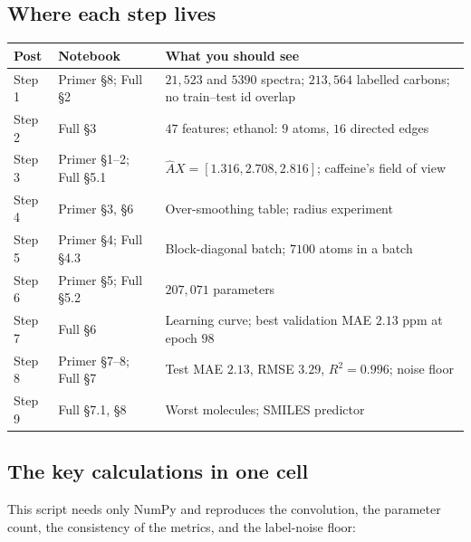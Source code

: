\documentclass[11pt]{article}
\newcommand{\Ah}{\hat{A}}
\begin{document}
\subsection{Where each step lives}
\begin{center}
\small
\begin{tabular}{@{}llp{6.2cm}@{}}
\toprule
Post & Notebook & What you should see\\
\midrule
Step 1 & Primer \S8; Full \S2 & $21{,}523$ and $5390$ spectra; $213{,}564$ labelled carbons; no train--test id overlap\\
Step 2 & Full \S3 & $47$ features; ethanol: $9$ atoms, $16$ directed edges\\
Step 3 & Primer \S1--2; Full \S5.1 & $\Ah X=[1.316,2.708,2.816]$; caffeine's field of view\\
Step 4 & Primer \S3, \S6 & Over-smoothing table; radius experiment\\
Step 5 & Primer \S4; Full \S4.3 & Block-diagonal batch; $7100$ atoms in a batch\\
Step 6 & Primer \S5; Full \S5.2 & $207{,}071$ parameters\\
Step 7 & Full \S6 & Learning curve; best validation MAE $2.13$ ppm at epoch $98$\\
Step 8 & Primer \S7--8; Full \S7 & Test MAE $2.13$, RMSE $3.29$, $R^2=0.996$; noise floor\\
Step 9 & Full \S7.1, \S8 & Worst molecules; SMILES predictor\\
\bottomrule
\end{tabular}
\end{center}

\subsection{The key calculations in one cell}
This script needs only NumPy and reproduces the convolution, the parameter count, the consistency of the metrics, and the label-noise floor:
\end{document}
